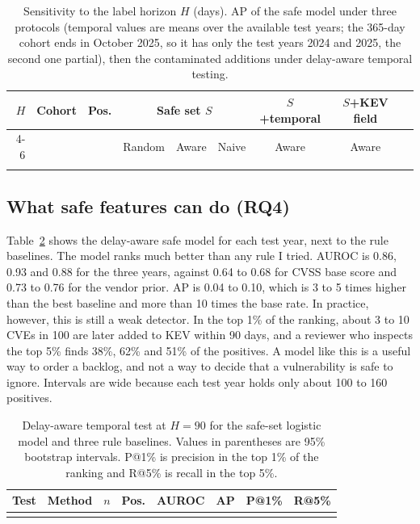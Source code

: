 \documentclass[conference,a4paper]{IEEEtran}
\begin{document}
\begin{table}[t]
\centering
\caption{Sensitivity to the label horizon $H$ (days). AP of the safe model under three protocols (temporal values are means over the available test years; the 365-day cohort ends in October 2025, so it has only the test years 2024 and 2025, the second one partial), then the contaminated additions under delay-aware temporal testing.}
\label{tab:h}
\small
\begin{tabular}{rrrcccccc}
\toprule
$H$ & Cohort & Pos. & \multicolumn{3}{c}{Safe set $S$} & $S$+temporal & $S$+KEV field\\
\cmidrule(lr){4-6}
 & & & Random & Aware & Naive & Aware & Aware \\
\midrule
\\
\bottomrule
\end{tabular}
\end{table}

\subsection{What safe features can do (RQ4)}

Table~\ref{tab:year} shows the delay-aware safe model for each test year, next to the rule baselines. The model ranks much better than any rule I tried. AUROC is 0.86, 0.93 and 0.88 for the three years, against 0.64 to 0.68 for CVSS base score and 0.73 to 0.76 for the vendor prior. AP is 0.04 to 0.10, which is 3 to 5 times higher than the best baseline and more than 10 times the base rate. In practice, however, this is still a weak detector. In the top 1\% of the ranking, about 3 to 10 CVEs in 100 are later added to KEV within 90 days, and a reviewer who inspects the top 5\% finds 38\%, 62\% and 51\% of the positives. A model like this is a useful way to order a backlog, and not a way to decide that a vulnerability is safe to ignore. Intervals are wide because each test year holds only about 100 to 160 positives.

\begin{table}[t]
\centering
\caption{Delay-aware temporal test at $H=90$ for the safe-set logistic model and three rule baselines. Values in parentheses are 95\% bootstrap intervals. P@1\% is precision in the top 1\% of the ranking and R@5\% is recall in the top 5\%.}
\label{tab:year}
\footnotesize
\begin{tabular}{llrrccrr}
\toprule
Test & Method & $n$ & Pos. & AUROC & AP & P@1\% & R@5\% \\
\midrule
\\
\bottomrule
\end{tabular}
\end{table}
\end{document}
